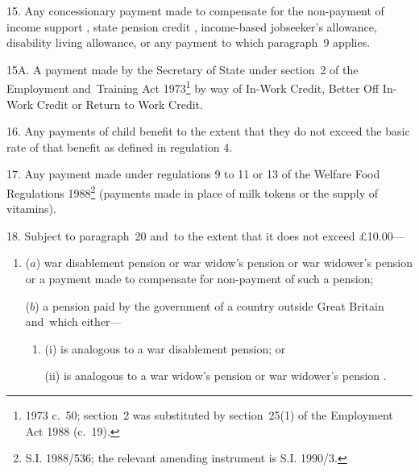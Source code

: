 \documentclass[12pt,a4paper]{article}
\begin{document}
\medskip

15.  Any concessionary payment made to compensate for the non-payment of income support%
, state pension credit%
, income-based jobseeker’s allowance,  %
disability living allowance, or any payment to which paragraph~9 applies.


\medskip

15A.  A payment made by the Secretary of State under section~2 of the Employment and~Training Act 1973\footnote{1973 c.~50; section~2 was substituted by section~25(1) of the Employment Act 1988 (c.~19).} by way of In-Work Credit, Better Off In-Work Credit or Return to Work Credit.


\medskip

16.  Any payments of child benefit to the extent that they do not exceed the basic rate of that benefit as defined in regulation 4.

\medskip

17.  Any payment made under regulations 9 to 11 or 13 of the Welfare Food Regulations 1988\footnote{\frenchspacing S.I. 1988/536; the relevant amending instrument is S.I. 1990/3.} (payments made in place of milk tokens or the supply of vitamins).

\medskip

18.  Subject to paragraph~20 and~to the extent that it does not exceed £10$.$00—
\begin{enumerate}\item[]
($a$) war disablement pension or war widow’s pension 
or war widower's pension  %
or a payment made to compensate for non-payment of such a pension;

($b$) a pension paid by the government of a country outside Great Britain and~which either—
\begin{enumerate}\item[]
(i) is analogous to a war disablement pension; or

(ii) is analogous to a war widow’s pension
or war widower's pension%
.
\end{enumerate}
\end{enumerate}
\end{document}
